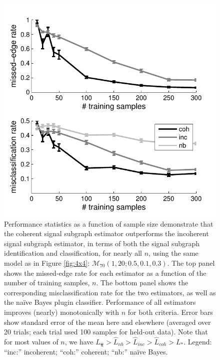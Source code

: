 \documentclass[10pt,journal,cspaper,compsoc]{IEEEtran}
\providecommand{\mc}[1]{\mathcal{#1}}
\providecommand{\wh}[1]{\widehat{#1}}
\providecommand{\mhb}[1]{\hat{\boldsymbol{#1}}}
\begin{document}
\begin{figure}[htbp]
	\centering
		\includegraphics[width=1.0\linewidth]{../figs/homo_V70_s20_p10_q30_Lhats.pdf}
	\caption{Performance statistics as a function of sample size demonstrate that the coherent signal subgraph estimator outperforms the incoherent signal subgraph estimator, in terms of both the signal subgraph identification and classification, for nearly all $n$, using the same model as in Figure \ref{fig:4x4}: $\mc{M}_{70}(1,20;0.5,0.1,0.3)$.  The top panel shows the missed-edge rate for each estimator as a function of the number of training samples, $n$.  The bottom panel shows the corresponding misclassification rate for the two estimators, as well as the na\"ive Bayes plugin classifier.  Performance of all estimators improves (nearly) monotonically with $n$ for both criteria.  Error bars show standard error of the mean here and elsewhere (averaged over 20 trials; each trial used 100 samples for held-out data). Note that for most values of $n$, we have $L_{\mhb{\pi}} > \wh{L}_{nb} > \wh{L}_{inc} > \wh{L}_{coh} > L_*$. Legend: ``inc:'' incoherent; ``coh:'' coherent; ``nb:'' na\"ive Bayes.}
	\label{fig:homo}
\end{figure}
\end{document}
